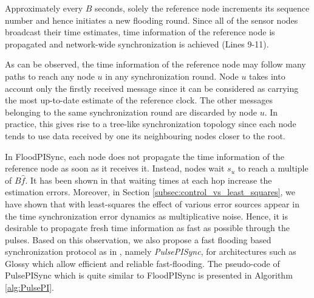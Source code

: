 \documentclass[english,a4paper,10pt,final]{article}
\numberwithin{equation}{section}
\numberwithin{figure}{section}
\begin{document}
Approximately every $B$ seconds, solely the reference node increments its sequence number and hence initiates a new flooding round. Since all of the sensor nodes broadcast their time estimates, time information of the reference node is propagated and network-wide synchronization is achieved (Lines 9-11). 

As can be observed, the  time information of the reference node may follow many paths to reach any node $u$ in any synchronization round. Node $u$ takes into account only the firstly received message since it can be considered as carrying the most up-to-date estimate of the reference clock. The other messages belonging to the same synchronization round are discarded by node $u$. In practice, this gives rise to a tree-like synchronization topology since each node tends to use data received by one its neighbouring nodes closer to the root.

In FloodPISync, each node does not propagate the time information of the reference node as soon as it receives it. Instead, nodes wait $s_{u}$ to reach a multiple of $B\hat{f}$. It has been shown in \cite{Lenzen2009Optimal} that waiting times at each hop increase the estimation errors. Moreover, in Section \ref{subsec:control_vs_least_squares}, we have shown that with least-squares the effect of various error sources appear in the time synchronization error dynamics as multiplicative noise. Hence, it is desirable to propagate fresh time information as fast as possible through the pulses. Based on this observation, we also propose a fast flooding based synchronization protocol as in \cite{Lenzen2009Optimal}, namely \textit{PulsePISync}, for architectures such as Glossy \cite{ferrari2011efficient} which allow efficient and reliable fast-flooding. The pseudo-code of PulsePISync which is quite similar to FloodPISync is presented in Algorithm \ref{alg:PulsePI}.
\end{document}
